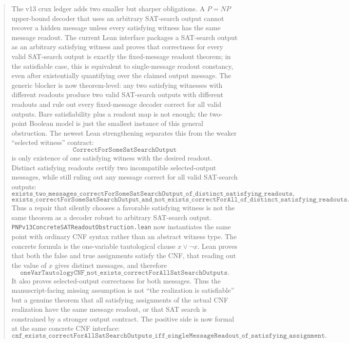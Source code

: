\documentclass[11pt]{article}
\theoremstyle{remark}
\begin{document}
\begin{abstract}
The v13 crux ledger adds two smaller but sharper obligations.  A \(P=NP\) upper-bound decoder that
uses an arbitrary SAT-search output cannot recover a hidden message unless every satisfying witness
has the same message readout.  The current Lean interface packages a SAT-search output as an
arbitrary satisfying witness and proves that correctness for every valid SAT-search output is
exactly the fixed-message readout theorem; in the satisfiable case, this is equivalent to
single-message readout constancy, even after existentially quantifying over the claimed output
message.  The generic blocker is now theorem-level: any two satisfying witnesses with different
readouts produce two valid SAT-search outputs with different readouts and rule out every
fixed-message decoder correct for all valid outputs.  Bare satisfiability plus a readout map is not
enough; the two-point Boolean model is just the smallest instance of this general obstruction.
The newest Lean strengthening separates this from the weaker ``selected witness'' contract:
\[
  \texttt{CorrectForSomeSatSearchOutput}
\]
is only existence of one satisfying witness with the desired readout.  Distinct satisfying
readouts certify two incompatible selected-output messages, while still ruling out any message
correct for all valid SAT-search outputs:
\[
  \texttt{exists\_two\_messages\_correctForSomeSatSearchOutput\_of\_distinct\_satisfying\_readouts},
\]
\[
  \texttt{exists\_correctForSomeSatSearchOutput\_and\_not\_exists\_correctForAll\_of\_distinct\_satisfying\_readouts}.
\]
Thus a repair that silently chooses a favorable satisfying witness is not the same theorem as a
decoder robust to arbitrary SAT-search output.
\texttt{PNPv13ConcreteSATReadoutObstruction.lean} now instantiates the same point with ordinary
CNF syntax rather than an abstract witness type.  The concrete formula is the one-variable
tautological clause \(x\lor\neg x\).  Lean proves that both the false and true assignments satisfy
the CNF, that reading out the value of \(x\) gives distinct messages, and therefore
\[
  \texttt{oneVarTautologyCNF\_not\_exists\_correctForAllSatSearchOutputs}.
\]
It also proves selected-output correctness for both messages.  Thus the manuscript-facing missing
assumption is not ``the realization is satisfiable'' but a genuine theorem that all satisfying
assignments of the actual CNF realization have the same message readout, or that SAT search is
constrained by a stronger output contract.  The positive side is now formal at the same concrete CNF
interface:
\[
  \texttt{cnf\_exists\_correctForAllSatSearchOutputs\_iff\_singleMessageReadout\_of\_satisfying\_assignment}.
\]
\end{abstract}
\end{document}
